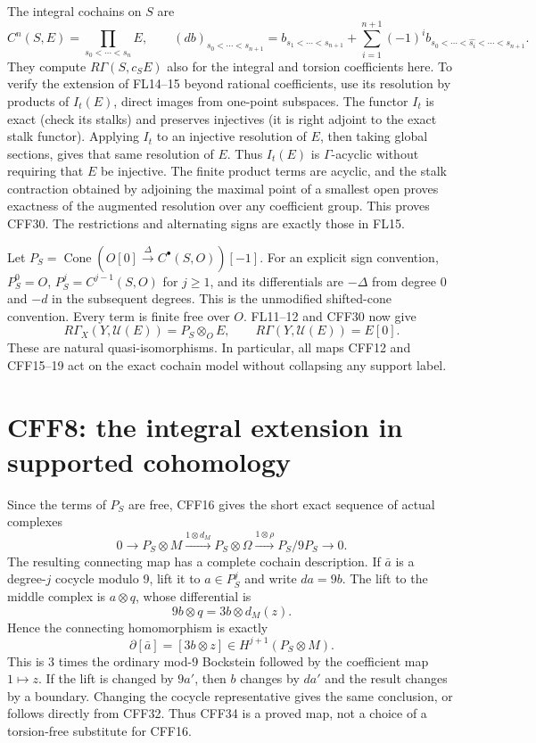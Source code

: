 \documentclass[11pt]{article}
\newcommand{\Cone}{\operatorname{Cone}}
\begin{document}
The integral cochains on \(S\) are
\[
 C^n(S,E)=\prod_{s_0<\cdots<s_n}E,\qquad
 (db)_{s_0<\cdots<s_{n+1}}
 =b_{s_1<\cdots<s_{n+1}}+
   \sum_{i=1}^{n+1}(-1)^i
     b_{s_0<\cdots<\widehat{s_i}<\cdots<s_{n+1}}.
 \tag{CFF30}
\]
They compute \(R\Gamma(S,c_SE)\) also for the integral
and torsion coefficients here. To verify the extension
of FL14--15 beyond rational coefficients, use its
resolution by products of \(I_t(E)\), direct images
from one-point subspaces. The functor \(I_t\) is exact
(check its stalks) and preserves injectives (it is right
adjoint to the exact stalk functor). Applying \(I_t\)
to an injective resolution of \(E\), then taking global
sections, gives that same resolution of \(E\).
Thus \(I_t(E)\) is \(\Gamma\)-acyclic without requiring
that \(E\) be injective. The finite product terms are
acyclic, and the stalk contraction obtained by adjoining
the maximal point of a smallest open proves exactness
of the augmented resolution over any coefficient group.
This proves CFF30. The restrictions and alternating
signs are exactly those in FL15.

Let \(P_S=\Cone(O[0]\xrightarrow{\Delta}C^\bullet(S,O))[-1]\).
For an explicit sign convention, \(P_S^0=O\),
\(P_S^j=C^{j-1}(S,O)\) for \(j\ge1\), and its
differentials are \(-\Delta\) from degree 0 and
\(-d\) in the subsequent degrees. This is the
unmodified shifted-cone convention. Every term is
finite free over \(O\). FL11--12 and CFF30 now give
\[
 R\Gamma_X(Y,\mathcal U(E))=P_S\otimes_O E,\qquad
 R\Gamma(Y,\mathcal U(E))=E[0].
 \tag{CFF31}
\]
These are natural quasi-isomorphisms. In particular,
all maps CFF12 and CFF15--19 act on the exact cochain
model without collapsing any support label.

\section{CFF8: the integral extension in supported cohomology}
Since the terms of \(P_S\) are free, CFF16 gives the
short exact sequence of actual complexes
\[
 0\longrightarrow P_S\otimes M
 \xrightarrow{1\otimes d_M}P_S\otimes\Omega
 \xrightarrow{1\otimes\rho}P_S/9P_S\longrightarrow0 .
 \tag{CFF32}
\]
The resulting connecting map has a complete cochain
description. If \(\bar a\) is a degree-\(j\) cocycle
modulo 9, lift it to \(a\in P_S^j\) and write
\(d a=9b\). The lift to the middle complex is
\(a\otimes q\), whose differential is
\[
 9b\otimes q=3b\otimes d_M(z).
 \tag{CFF33}
\]
Hence the connecting homomorphism is exactly
\[
 \partial[\bar a]=[3b\otimes z]
       \in H^{j+1}(P_S\otimes M).
 \tag{CFF34}
\]
This is 3 times the ordinary mod-9 Bockstein followed
by the coefficient map \(1\mapsto z\). If the lift is
changed by \(9a'\), then \(b\) changes by \(da'\) and
the result changes by a boundary. Changing the cocycle
representative gives the same conclusion, or follows
directly from CFF32. Thus CFF34 is a proved map,
not a choice of a torsion-free substitute for CFF16.
\end{document}
